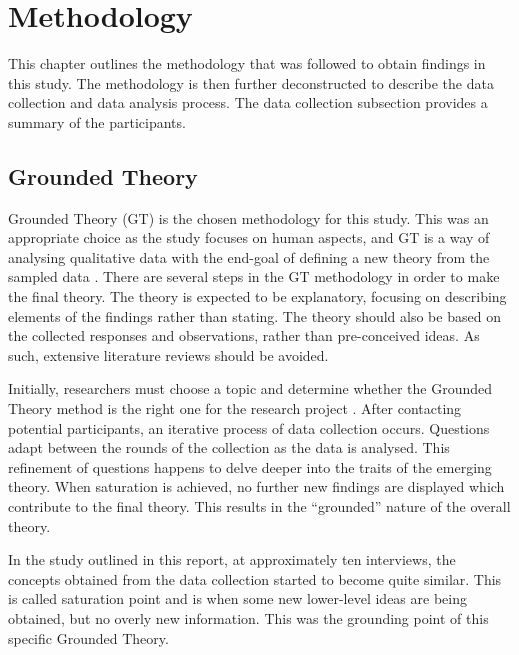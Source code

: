 \chapter{Methodology}\label{C:Methodology}

This chapter outlines the methodology that was followed to obtain findings in this study. The methodology is then further deconstructed to describe the data collection and data analysis process. The data collection subsection provides a summary of the participants.

\section{Grounded Theory} 

Grounded Theory (GT) is the chosen methodology for this study. This was an appropriate choice as the study focuses on human aspects, and GT is a way of analysing qualitative data with the end-goal of defining a new theory from the sampled data \cite{geeks}. There are several steps in the GT  methodology in order to make the final theory.  The theory is expected to be explanatory, focusing on describing elements of the findings rather than stating. The theory should also be based on the collected responses and observations, rather than pre-conceived ideas. As such, extensive literature reviews should be avoided.
\newline
\par Initially, researchers must choose a topic and determine whether the Grounded Theory method is the right one for the research project \cite{geeks}. After contacting potential participants, an iterative process of data collection occurs. Questions adapt between the rounds of the collection as the data is analysed. This refinement of questions happens to delve deeper into the traits of the emerging theory. When saturation is achieved, no further new findings are displayed which contribute to the final theory. This results in the “grounded” nature of the overall theory.
\newline
\par 
In the study outlined in this report, at approximately ten interviews, the concepts obtained from the data collection started to become quite similar. This is called saturation point and is when some new lower-level ideas are being obtained, but no overly new information. This was the grounding point of this specific Grounded Theory. 
\newline

